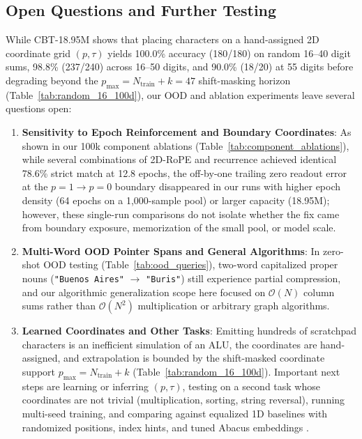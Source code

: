 \documentclass[10pt,twocolumn]{article}
\begin{document}
\subsection{Open Questions and Further Testing}
While CBT-18.95M shows that placing characters on a hand-assigned 2D coordinate grid $(p, \tau)$ yields 100.0\% accuracy (180/180) on random 16--40 digit sums, 98.8\% (237/240) across 16--50 digits, and 90.0\% (18/20) at 55 digits before degrading beyond the $p_{\max} = N_{\text{train}} + k = 47$ shift-masking horizon (Table~\ref{tab:random_16_100d}), our OOD and ablation experiments leave several questions open:
\begin{enumerate}[leftmargin=*,nosep]
    \item \textbf{Sensitivity to Epoch Reinforcement and Boundary Coordinates}: As shown in our 100k component ablations (Table~\ref{tab:component_ablations}), while several combinations of 2D-RoPE and recurrence achieved identical 78.6\% strict match at 12.8 epochs, the off-by-one trailing zero readout error at the $p=1 \to p=0$ boundary disappeared in our runs with higher epoch density (64 epochs on a 1,000-sample pool) or larger capacity (18.95M); however, these single-run comparisons do not isolate whether the fix came from boundary exposure, memorization of the small pool, or model scale.
    \item \textbf{Multi-Word OOD Pointer Spans and General Algorithms}: In zero-shot OOD testing (Table~\ref{tab:ood_queries}), two-word capitalized proper nouns (\texttt{"Buenos Aires"} $\to$ \texttt{"Buris"}) still experience partial compression, and our algorithmic generalization scope here focused on $\mathcal{O}(N)$ column sums rather than $\mathcal{O}(N^2)$ multiplication or arbitrary graph algorithms.
    \item \textbf{Learned Coordinates and Other Tasks}: Emitting hundreds of scratchpad characters is an inefficient simulation of an ALU, the coordinates are hand-assigned, and extrapolation is bounded by the shift-masked coordinate support $p_{\max} = N_{\text{train}} + k$ (Table~\ref{tab:random_16_100d}). Important next steps are learning or inferring $(p,\tau)$, testing on a second task whose coordinates are not trivial (multiplication, sorting, string reversal), running multi-seed training, and comparing against equalized 1D baselines with randomized positions, index hints, and tuned Abacus embeddings \cite{ruoss2023randomized,zhou2024transformers,duan2023interpolation,fan2024looped}.
\end{enumerate}
\end{document}
